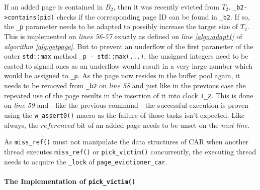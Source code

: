 	If an added page is contained in $B_2$, then it was recently evicted from $T_2$. \lstinline{_b2->contains(pid)} checks if the corresponding page ID can be found in \lstinline{_b2}. If so, the \lstinline{_p} parameter needs to be adapted to possibly increase the target size of $T_2$. This is implemented on \emph{lines 56-57} exactly as defined on \emph{line \ref{algo:adapt1}} of \emph{algorithm \ref{alg:getpage}}. But to prevent an underflow of the first parameter of the outer \lstinline{std::max} method \lstinline{_p - std::max(...)}, the unsigned integers need to be casted to signed ones as an underflow would result in a very large number which would be assigned to \lstinline{_p}. As the page now resides in the buffer pool again, it needs to be removed from \lstinline{_b2} on \emph{line 58} and just like in the previous case the repeated use of the page results in the insertion of it into clock \lstinline{T_2}. This is done on \emph{line 59} and - like the previous command - the successful execution is proven using the \lstinline{w_assert0()} macro as the failure of those tasks isn't expected. Like always, the $referenced$ bit of an added page needs to be unset on the \emph{next line}.
	
	As \lstinline{miss_ref()} must not manipulate the data structures of CAR when another thread executes \lstinline{miss_ref()} or \lstinline{pick_victim()} concurrently, the executing thread needs to acquire the \lstinline{_lock} of \lstinline{page_evictioner_car}.
	
\paragraph{The Implementation of \lstinline{pick_victim()}}

\begin{@empty}
	\lstset{
		language = [ISO]C++,
		style = basic
	}
	\begin{code}[ht!]
		\caption{Implementation of \lstinline{page_evictioner_car::pick_victim()}} \label{lst:carpickvictim}
		
	\end{code}
	\begin{code}[ht!]
		\ContinuedFloat
		\caption{Implementation of \lstinline{page_evictioner_car::pick_victim()} (cont.)} \label{lst:carpickvictim}
		
	\end{code}
\end{@empty}

